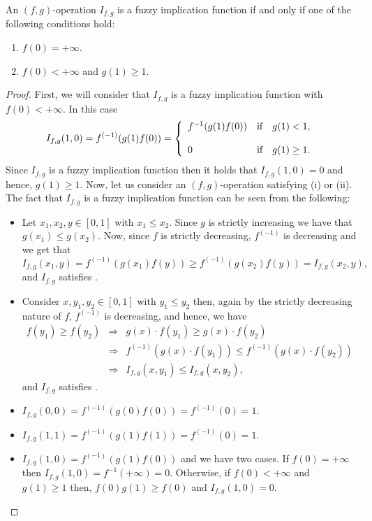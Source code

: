 \begin{theorem}\label{th:(f,g)implications} An $(f,g)$-operation $I_{f,g}$ is a fuzzy implication function if and only if one of the following conditions hold:
	\begin{enumerate}[label=(\roman*)]
		\item $f(0)=+\infty$.
		\item $f(0)< +\infty$ and $g(1) \geq 1$.
	\end{enumerate}
\end{theorem}
\begin{proof}
	First, we will consider that $I_{f,g}$ is a fuzzy implication function with $f(0)< + \infty$. In this case
	$$I_{f,g}(1,0)=f^{(-1)}(g(1)f(0)) =  \left\{ \begin{array}{lcc}
		f^{-1}(g(1)f(0)) &   \hbox{if}  & g(1) < 1, \\
		\\ 0 &   \hbox{if} & g(1)\geq 1.
	\end{array}
	\right.
	$$
	Since $I_{f,g}$ is a fuzzy implication function then it holds that $I_{f,g}(1,0)=0$ and hence, $g(1) \geq 1 $. Now, let us consider an $(f,g)$-operation satisfying (i) or (ii). The fact that $I_{f,g}$ is a fuzzy implication function can be seen from the following:
	\begin{itemize}
		\item Let $x_1,x_2,y \in [0,1]$ with $x_1 \leq x_2$. Since $g$ is strictly increasing we have that $g(x_1) \leq g(x_2)$. Now, since $f$ is strictly decreasing, $f^{(-1)}$ is decreasing and we get that
		$$ I_{f,g}(x_1,y) = f^{(-1)}(g(x_1)f(y)) \geq f^{(-1)}(g(x_2)f(y)) =I_{f,g}(x_2,y),$$
		and $I_{f,g}$ satisfies \Ione.
		\item Consider $x,y_1,y_2 \in [0,1]$ with $y_1 \leq y_2$ then, again by the strictly decreasing nature of $f$, $f^{(-1)}$ is decreasing, and hence, we have
		\begin{eqnarray*}
			f(y_1) \geq f(y_2) &\Rightarrow& g(x) \cdot f(y_1) \geq g(x) \cdot f(y_2) \\
			&\Rightarrow & f^{(-1)}(g(x) \cdot f(y_1)) \leq f^{(-1)}(g(x) \cdot f(y_2)) \\
			&\Rightarrow & I_{f,g}(x,y_1) \leq I_{f,g}(x,y_2),
		\end{eqnarray*}
		and $I_{f,g}$ satisfies \Itwo.
		\item $I_{f,g}(0,0)=f^{(-1)}(g(0)f(0))=f^{(-1)}(0)=1$.
		\item $I_{f,g}(1,1)=f^{(-1)}(g(1)f(1))=f^{(-1)}(0)=1$.
		\item $I_{f,g}(1,0)=f^{(-1)}(g(1)f(0))$ and we have two cases. If $f(0)= + \infty$ then $I_{f,g}(1,0)=f^{-1}(+\infty)=0$. Otherwise, if $f(0) < +\infty$ and $g(1) \geq 1$ then, $f(0)g(1) \geq f(0)$ and $I_{f,g}(1,0)=0$.
	\end{itemize}
\end{proof}
